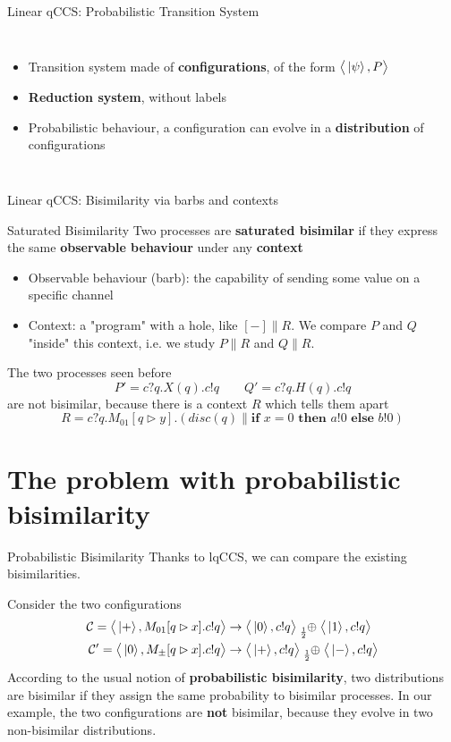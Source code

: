 \documentclass{beamer}
\newcommand{\kp}{\ket{\psi}}
\newcommand{\kz}{\ket{0}}
\newcommand{\ko}{\ket{1}}
\newcommand{\kpl}{\ket{+}}
\newcommand{\km}{\ket{-}}
\newcommand{\psum}[1]{\tensor[_{#1}]{\oplus}{}}
\newcommand{\conf}{\mathcal{C}}
\newcommand{\confw}[1]{\big\langle#1\big\rangle}
\newcommand{\blank}{{-}}
\newcommand{\ite}[3]{\textbf{if } #1 \textbf{ then } #2 \textbf{ else } #3}
\begin{document}
\begin{frame}{Linear qCCS: Probabilistic Transition System}
\begin{columns}
\begin{itemize}
\item Transition system made of \textbf{configurations}, of the form $\confw{\kp, P}$
\item \textbf{Reduction system}, without labels
\item Probabilistic behaviour, a configuration can evolve in a \textbf{distribution} of configurations
\end{itemize}
\pause
{}
\end{columns}
\end{frame}


\begin{frame}{Linear qCCS: Bisimilarity via barbs and contexts}

\begin{block}{Saturated Bisimilarity}
Two processes are \textbf{saturated bisimilar} if they express the same \textbf{observable behaviour} under any \textbf{context} 
\begin{itemize}
\item 
Observable behaviour (barb): the capability of sending some value on a specific channel
\item Context: a "program" with a hole, like $[\blank] \parallel R$. We compare $P$ and $Q$ "inside" this context, i.e. we study $P \parallel R$ and $Q \parallel R$.
\end{itemize}
\end{block}


\pause
The two processes seen before \[
 P' = c?q.X(q).c!q \qquad Q' = c?q.H(q).c!q
\]
are not bisimilar, because there is a context $R$ which tells them apart
\[ R = c?q.M_{01}[q \rhd y].\left( disc(q)\parallel \ite{x = 0}{a!0}{b!0}\right)\]

\end{frame}


\section{The problem with probabilistic bisimilarity}
\begin{frame}{Probabilistic Bisimilarity}
Thanks to lqCCS, we can compare the existing bisimilarities. 

Consider the two configurations 
\begin{align*}
\conf = \confw{\kpl, M_{01}[q \rhd x].c!q} &\rightarrow \confw{\kz, c!q} \psum{\frac{1}{2}} \confw{\ko, c!q} \\
\conf' = \confw{\kz, M_{\pm}[q \rhd x].c!q} &\rightarrow \confw{\kpl, c!q} \psum{\frac{1}{2}} \confw{\km, c!q}
\end{align*}
\pause
According to the usual notion of \textbf{probabilistic bisimilarity}, two distributions are bisimilar if they assign the same probability to bisimilar processes. In our example, the two configurations  are \textbf{not} bisimilar, because they evolve in two non-bisimilar distributions.

\end{frame}
\end{document}

